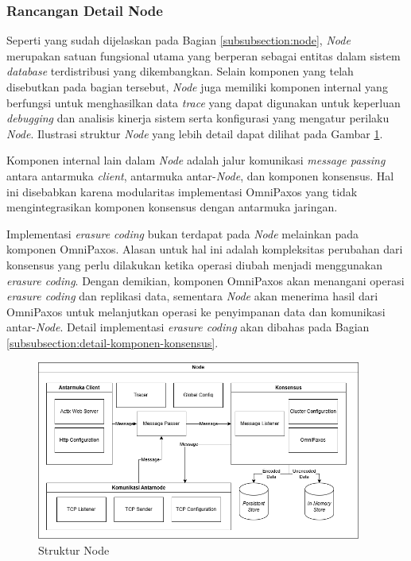 \subsubsection{Rancangan Detail Node}
\label{subsubsection:detail-node}

Seperti yang sudah dijelaskan pada Bagian \ref{subsubsection:node}, \textit{Node} merupakan satuan fungsional utama yang berperan sebagai entitas dalam sistem \textit{database} terdistribusi yang dikembangkan. Selain komponen yang telah disebutkan pada bagian tersebut, \textit{Node} juga memiliki komponen internal yang berfungsi untuk menghasilkan data \textit{trace} yang dapat digunakan untuk keperluan \textit{debugging} dan analisis kinerja sistem serta konfigurasi yang mengatur perilaku \textit{Node}. Ilustrasi struktur \textit{Node} yang lebih detail dapat dilihat pada Gambar \ref{fig:node-structure}.

Komponen internal lain dalam \textit{Node} adalah jalur komunikasi \textit{message passing} antara antarmuka \textit{client}, antarmuka antar-\textit{Node}, dan komponen konsensus. Hal ini disebabkan karena modularitas implementasi OmniPaxos yang tidak mengintegrasikan komponen konsensus dengan antarmuka jaringan.

Implementasi \textit{erasure coding} bukan terdapat pada \textit{Node} melainkan pada komponen OmniPaxos. Alasan untuk hal ini adalah kompleksitas perubahan dari konsensus yang perlu dilakukan ketika operasi diubah menjadi menggunakan \textit{erasure coding}. Dengan demikian, komponen OmniPaxos akan menangani operasi \textit{erasure coding} dan replikasi data, sementara \textit{Node} akan menerima hasil dari OmniPaxos untuk melanjutkan operasi ke penyimpanan data dan komunikasi antar-\textit{Node}. Detail implementasi \textit{erasure coding} akan dibahas pada Bagian \ref{subsubsection:detail-komponen-konsensus}.

\begin{figure}[ht]
	\centering
	\includegraphics[width=0.95\textwidth]{resources/chapter-3/node-architecture.png}
	\caption{Struktur Node}
	\label{fig:node-structure}
\end{figure}
